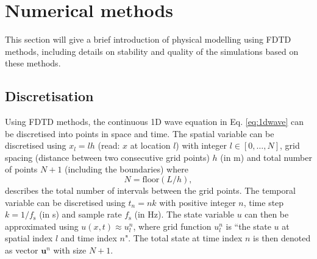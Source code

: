 \documentclass[dvipsnames, reprint]{JASA}
\begin{document}
\section{Numerical methods}\label{sec:FDTD}
This section will give a brief introduction of physical modelling using FDTD methods, including details on stability and quality of the simulations based on these methods.

\subsection{Discretisation}
Using FDTD methods, the continuous 1D wave equation in Eq. \eqref{eq:1dwave} can be discretised into points in space and time. The spatial variable can be discretised using $x_l = lh$ (read: $x$ at location $l$) with integer $l \in [0, \hdots, N]$, grid spacing (distance between two consecutive grid points) $h$ (in m) and total number of points $N + 1$ (including the boundaries) where
\begin{equation}\label{eq:numberOfIntervals}
    N = \text{floor}(L/h),
\end{equation}
describes the total number of intervals between the grid points. The temporal variable can be discretised using $t_n = nk$ with positive integer $n$, time step $k = 1/f_\text{s}$ (in s) and sample rate $f_\text{s}$ (in Hz). The state variable $u$ can then be approximated using $u(x,t) \approx u_l^n$, where grid function $u_l^n$ is ``the state $u$ at spatial index $l$ and time index $n$". The total state at time index $n$ is then denoted as vector $\mathbf{u}^n$ with size $N+1$.
\end{document}
